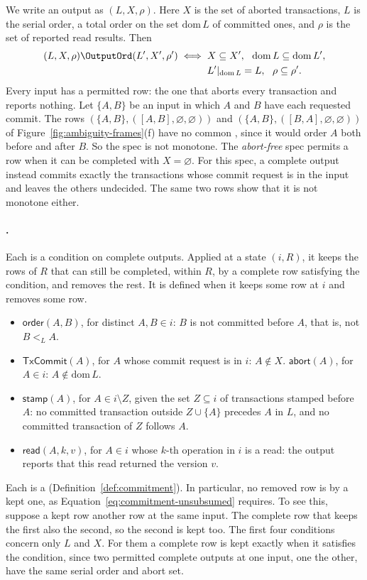 We write an output as $(L,X,\rho)$.  Here $X$ is the set of aborted
transactions, $L$ is the serial order, a total order on the set
$\mathrm{dom}\,L$ of committed ones, and $\rho$ is the set of reported read
results.  Then
\[
  \begin{aligned}
  (L,X,\rho)\OutputOrd(L',X',\rho')
  \iff{}& X\subseteq X',\ \ \mathrm{dom}\,L\subseteq\mathrm{dom}\,L',\\
         & L'|_{\mathrm{dom}\,L}=L,\ \ \rho\subseteq\rho'.
  \end{aligned}
\]
Every input has a permitted row: the one that aborts every transaction and
reports nothing.  Let $\{A,B\}$ be an input in which $A$ and $B$ have each
requested commit.  The rows $(\{A,B\},([A,B],\varnothing,\varnothing))$ and
$(\{A,B\},([B,A],\varnothing,\varnothing))$ of
Figure~\ref{fig:ambiguity-frames}(f) have no common \outnoun, since it would
order $A$ both before and after $B$.  So the spec is not monotone.  The
\emph{abort-free} spec permits a row when it can be completed with
$X=\varnothing$.  For this spec, a complete output instead commits exactly the
transactions whose commit request is in the input and leaves the others
undecided.  The same two rows show that it is not monotone either.

\paragraph{\Commitments.}
Each \commitment is a condition on complete outputs.  Applied at a state
$(i,R)$, it keeps the rows of $R$ that can still be completed, within $R$, by a
complete row satisfying the condition, and removes the rest.  It is defined
when it keeps some row at $i$ and removes some row.
\begin{itemize}
  \item $\mathsf{order}(A,B)$, for distinct $A,B\in i$: $B$ is not committed
        before $A$, that is, not $B<_L A$.
  \item $\mathsf{TxCommit}(A)$, for $A$ whose commit request is in $i$:
        $A\notin X$.\quad
        $\mathsf{abort}(A)$, for $A\in i$: $A\notin\mathrm{dom}\,L$.
  \item $\mathsf{stamp}(A)$, for $A\in i\setminus Z$, given the set $Z\subseteq
        i$ of transactions stamped before $A$: no committed transaction outside
        $Z\cup\{A\}$ precedes $A$ in $L$, and no committed transaction of $Z$
        follows $A$.
  \item $\mathsf{read}(A,k,v)$, for $A\in i$ whose $k$-th operation in $i$ is a
        read: the output reports that this read returned the version $v$.
\end{itemize}
Each is a \commitment (Definition~\ref{def:commitment}).  In particular, no
removed row is \outrelpast by a kept one, as
Equation~\ref{eq:commitment-unsubsumed} requires.  To see this, suppose a kept
row \outrel another row at the same input.  The complete row that keeps the
first also \outrel the second, so the second is kept too.  The first four
conditions concern only $L$ and $X$.  For them a complete row is kept exactly
when it satisfies the condition, since two permitted complete outputs at one
input, one \outrelpart the other, have the same serial order and abort set.

